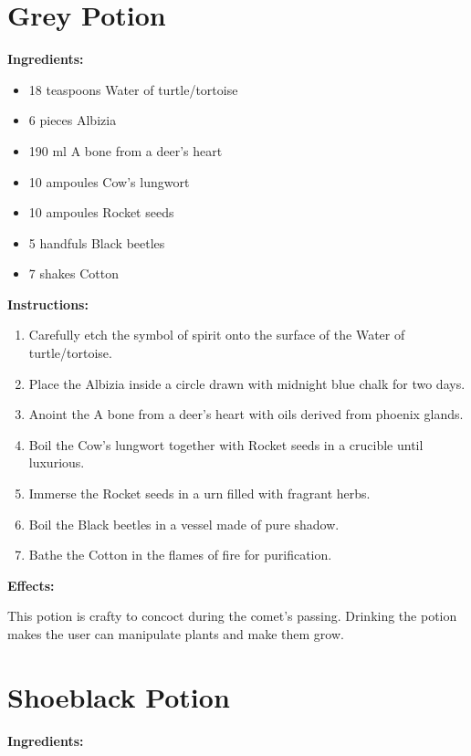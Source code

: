 \documentclass{article}
\begin{document}
\newpage
\section*{Grey Potion}

\textbf{Ingredients:}

\begin{itemize}
  \item 18 teaspoons Water of turtle/tortoise
  \item 6 pieces Albizia
  \item 190 ml A bone from a deer's heart
  \item 10 ampoules Cow's lungwort
  \item 10 ampoules Rocket seeds
  \item 5 handfuls Black beetles
  \item 7 shakes Cotton
\end{itemize}

\textbf{Instructions:}

\begin{enumerate}
  \item Carefully etch the symbol of spirit onto the surface of the Water of turtle/tortoise.
  \item Place the Albizia inside a circle drawn with midnight blue chalk for two days.
  \item Anoint the A bone from a deer's heart with oils derived from phoenix glands.
  \item Boil the Cow's lungwort together with Rocket seeds in a crucible until luxurious.
  \item Immerse the Rocket seeds in a urn filled with fragrant herbs.
  \item Boil the Black beetles in a vessel made of pure shadow.
  \item Bathe the Cotton in the flames of fire for purification.
\end{enumerate}

\textbf{Effects:}

This potion is crafty to concoct during the comet’s passing. Drinking the potion makes the user can manipulate plants and make them grow.

\newpage
\section*{Shoeblack Potion}

\textbf{Ingredients:}
\end{document}
